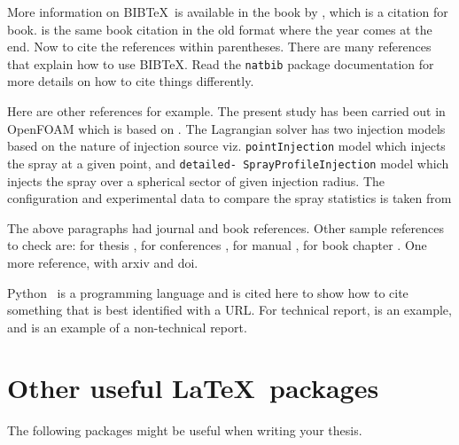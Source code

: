 More information on BIB\TeX\ is available in the book by
\cite{lamport:86}, which is a citation for book. \cite{lamport1:86} is
the same book citation in the old format where the year comes at the end.
 Now to cite the references within parentheses. There are many 
references~\citep{lamport:86} that explain 
how to use BIB\TeX.  Read the \verb+natbib+ package documentation 
for more details on how to cite things differently.

Here are other references for example.  The present study has been 
carried out in OpenFOAM which is based on \cite{Weller1998}. 
The Lagrangian solver has two injection models based on the nature 
of injection source viz. \texttt{pointInjection} model which injects
the spray at a given point, and \texttt{detailed- SprayProfileInjection}
model which injects the spray over a spherical sector of given injection
radius. The configuration and experimental data to compare the spray
statistics is taken from \cite{Zhou2015a}

The above paragraphs had journal and book references.
Other sample references to check are: for thesis \cite{Syed2013,
Cheekati2014,Syed2020}, for conferences \cite{Sasidharan2017,Syed2018,
Syed2018a}, for manual \cite{Ayachit2015},  for book chapter \cite{Ahren2005}.
One more reference, \cite{Roenby2016} with arxiv and doi.

Python~\citep{py:python} is a programming language and is
cited here to show how to cite something that is best identified with
a URL. For technical report, \cite{Syed2015} is an example,
and \cite{UnitedNations2019} is an example of a non-technical report.

\section{Other useful \LaTeX\ packages}

The following packages might be useful when writing your thesis.

